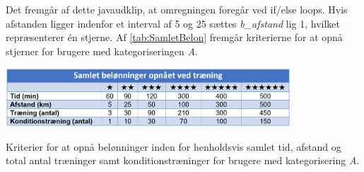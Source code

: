 \noindent
Det fremgår af dette javaudklip, at omregningen foregår ved if/else loops. Hvis afstanden ligger indenfor et interval af 5 og 25 sættes \textit{b\_afstand} lig 1, hvilket repræsenterer én stjerne. Af \autoref{tab:SamletBelon} fremgår kriterierne for at opnå stjerner for brugere med kategoriseringen \textit{A}.  

\begin{table}[H]
\centering
\includegraphics[width=0.8\textwidth]{figures/imple/SamletBelon}
\caption{Kriterier for at opnå belønninger inden for henholdsvis samlet tid, afstand og total antal træninger samt konditionstræninger for brugere med kategorisering \textit{A}.}
\label{tab:SamletBelon}
\end{table}  

